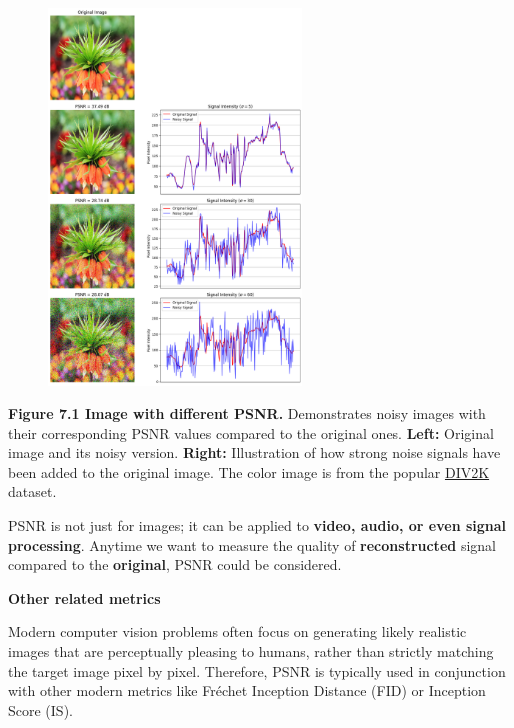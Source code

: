 \begin{figure}[ht!]
    \centering
    \includegraphics[width=0.6\textwidth]{figures/PSNR_plot.png}
    \label{PSNR plot}
\end{figure}


\textbf{Figure 7.1 Image with different PSNR.} Demonstrates noisy images with their corresponding PSNR values compared to the original ones. \textbf{Left:} Original image and its noisy version. 
\textbf{Right:} Illustration of how strong noise signals have been added to the original image.
The color image is from the popular \href{https://data.vision.ee.ethz.ch/cvl/DIV2K/}{DIV2K} dataset.
\vspace{-12pt} 

{PSNR is not just for images; it can be applied to \textbf{video, audio, or even signal processing}. Anytime we want to measure the quality of \textbf{reconstructed} signal compared to the \textbf{original}, PSNR could be considered.}

\vspace{-5pt} 

\textbf{Other related metrics}

\vspace{-5pt} 

Modern computer vision problems often focus on generating likely realistic images that are perceptually pleasing to humans, rather than strictly matching the
target image pixel by pixel. Therefore, PSNR is typically used in conjunction with other modern metrics like Fréchet Inception Distance (FID) or Inception Score (IS).


